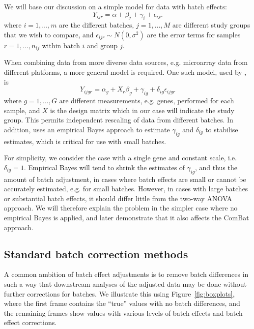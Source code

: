 \documentclass[oupdraft]{bio}
\begin{document}
We will base our discussion on a simple model for data with batch effects:
\begin{equation}
Y_{ijr}=\alpha+\beta_j+\gamma_i+\epsilon_{ijr}
\end{equation}
where $i=1,\ldots,m$ are the different batches, $j=1,\ldots,M$ are different study groups that we wish to compare, and $\epsilon_{ijr}\sim N(0,\sigma^2)$ are the error terms for samples $r=1,\ldots,n_{ij}$ within batch $i$ and group $j$.

When combining data from more diverse data sources, e.g. microarray data from different platforms, a more general model is required. One such model, used by \citet{Johnson2007}, is
\begin{equation}
Y_{ijgr}=\alpha_g+X_r\beta_{g}+\gamma_{ig}+\delta_{ig}\epsilon_{ijgr}
\end{equation}
where $g=1,\ldots,G$ are different measurements, e.g. genes, performed for each sample, and $X$ is the design matrix which in our case will indicate the study group. This permits independent rescaling of data from different batches. In addition, \citet{Johnson2007} uses an empirical Bayes approach to estimate $\gamma_{ig}$ and $\delta_{ig}$ to stabilise estimates, which is critical for use with small batches.

For simplicity, we consider the case with a single gene and constant scale, i.e. $\delta_{ig}=1$. Empirical Bayes will tend to shrink the estimates of  $\gamma_{ig}$, and thus the amount of batch adjustment, in cases where batch effects are small or cannot be accurately estimated, e.g. for small batches. However, in cases with large batches or substantial batch effects, it should differ little from the two-way ANOVA approach. We will therefore explain the problem in the simpler case where no empirical Bayes is applied, and later demonstrate that it also affects the ComBat approach.

\subsection{Standard batch correction methods}

A common ambition of batch effect adjustments is to remove batch differences in such a way that downstream analyses of the adjusted data may be done without further corrections for batches. We illustrate this using Figure~\ref{fig:boxplots}, where the first frame contains the ``true'' values with no batch differences, and the remaining frames show values with various levels of batch effects and batch effect corrections.
\end{document}

